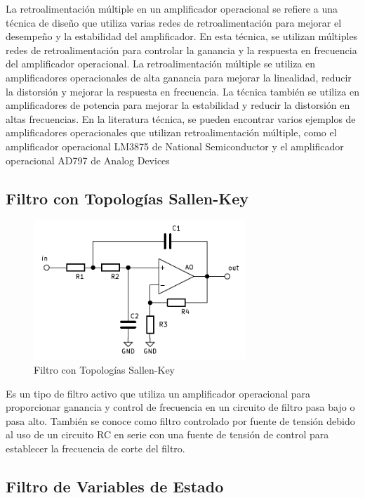         La retroalimentación múltiple en un amplificador operacional se refiere a una técnica de diseño que utiliza varias redes de retroalimentación para mejorar el desempeño y la estabilidad del amplificador. En esta técnica, se utilizan múltiples redes de retroalimentación para controlar la ganancia y la respuesta en frecuencia del amplificador operacional. La retroalimentación múltiple se utiliza en amplificadores operacionales de alta ganancia para mejorar la linealidad, reducir la distorsión y mejorar la respuesta en frecuencia. La técnica también se utiliza en amplificadores de potencia para mejorar la estabilidad y reducir la distorsión en altas frecuencias. En la literatura técnica, se pueden encontrar varios ejemplos de amplificadores operacionales que utilizan retroalimentación múltiple, como el amplificador operacional LM3875 de National Semiconductor y el amplificador operacional AD797 de Analog Devices

    \subsection{Filtro con Topologías Sallen-Key}

        \begin{figure}[H]
              \centering
              \includegraphics[width=8cm]{Imagenes/sallen_key.png}
              \caption{Filtro con Topologías Sallen-Key}
              \label{fig:sallen_key0}
        \end{figure}

        Es un tipo de filtro activo que utiliza un amplificador operacional para proporcionar ganancia y control de frecuencia en un circuito de filtro pasa bajo o pasa alto. También se conoce como filtro controlado por fuente de tensión debido al uso de un circuito RC en serie con una fuente de tensión de control para establecer la frecuencia de corte del filtro.

    \subsection{Filtro de Variables de Estado}

